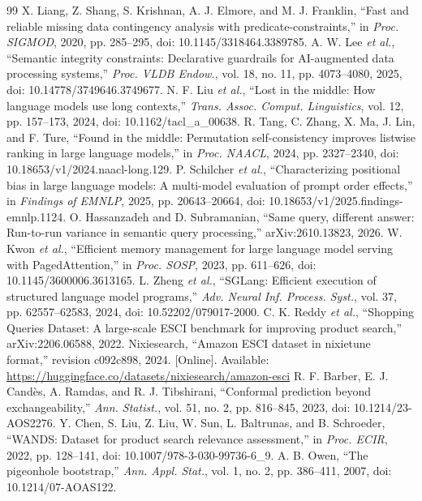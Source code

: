 \documentclass[conference]{IEEEtran}
\begin{document}
\begin{thebibliography}{99}
 X. Liang, Z. Shang, S. Krishnan, A. J. Elmore, and M. J. Franklin, ``Fast and reliable missing data contingency analysis with predicate-constraints,'' in \emph{Proc. SIGMOD}, 2020, pp. 285--295, doi: 10.1145/3318464.3389785.
 A. W. Lee \emph{et al.}, ``Semantic integrity constraints: Declarative guardrails for AI-augmented data processing systems,'' \emph{Proc. VLDB Endow.}, vol. 18, no. 11, pp. 4073--4080, 2025, doi: 10.14778/3749646.3749677.
 N. F. Liu \emph{et al.}, ``Lost in the middle: How language models use long contexts,'' \emph{Trans. Assoc. Comput. Linguistics}, vol. 12, pp. 157--173, 2024, doi: 10.1162/tacl\_a\_00638.
 R. Tang, C. Zhang, X. Ma, J. Lin, and F. Ture, ``Found in the middle: Permutation self-consistency improves listwise ranking in large language models,'' in \emph{Proc. NAACL}, 2024, pp. 2327--2340, doi: 10.18653/v1/2024.naacl-long.129.
 P. Schilcher \emph{et al.}, ``Characterizing positional bias in large language models: A multi-model evaluation of prompt order effects,'' in \emph{Findings of EMNLP}, 2025, pp. 20643--20664, doi: 10.18653/v1/2025.findings-emnlp.1124.
 O. Hassanzadeh and D. Subramanian, ``Same query, different answer: Run-to-run variance in semantic query processing,'' arXiv:2610.13823, 2026.
 W. Kwon \emph{et al.}, ``Efficient memory management for large language model serving with PagedAttention,'' in \emph{Proc. SOSP}, 2023, pp. 611--626, doi: 10.1145/3600006.3613165.
 L. Zheng \emph{et al.}, ``SGLang: Efficient execution of structured language model programs,'' \emph{Adv. Neural Inf. Process. Syst.}, vol. 37, pp. 62557--62583, 2024, doi: 10.52202/079017-2000.
 C. K. Reddy \emph{et al.}, ``Shopping Queries Dataset: A large-scale ESCI benchmark for improving product search,'' arXiv:2206.06588, 2022.
 Nixiesearch, ``Amazon ESCI dataset in nixietune format,'' revision c092c898, 2024. [Online]. Available: \url{https://huggingface.co/datasets/nixiesearch/amazon-esci}
 R. F. Barber, E. J. Cand\`es, A. Ramdas, and R. J. Tibshirani, ``Conformal prediction beyond exchangeability,'' \emph{Ann. Statist.}, vol. 51, no. 2, pp. 816--845, 2023, doi: 10.1214/23-AOS2276.
 Y. Chen, S. Liu, Z. Liu, W. Sun, L. Baltrunas, and B. Schroeder, ``WANDS: Dataset for product search relevance assessment,'' in \emph{Proc. ECIR}, 2022, pp. 128--141, doi: 10.1007/978-3-030-99736-6\_9.
 A. B. Owen, ``The pigeonhole bootstrap,'' \emph{Ann. Appl. Stat.}, vol. 1, no. 2, pp. 386--411, 2007, doi: 10.1214/07-AOAS122.

\end{thebibliography}
\end{document}
